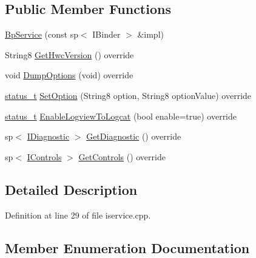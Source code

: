 \subsection*{Public Member Functions}
\begin{DoxyCompactItemize}
\item 
\mbox{\hyperlink{classhwcomposer_1_1BpService_a62e17be4899fc0e9af815cefa9956971}{Bp\+Service}} (const sp$<$ I\+Binder $>$ \&impl)
\item 
String8 \mbox{\hyperlink{classhwcomposer_1_1BpService_a17ce9341ddf723a5e0a565f3dcf0495b}{Get\+Hwc\+Version}} () override
\item 
void \mbox{\hyperlink{classhwcomposer_1_1BpService_a9685bc5b64d6666e6ad3607b6c127bda}{Dump\+Options}} (void) override
\item 
\mbox{\hyperlink{hwcserviceapi_8h_a3806fb2027d9a316d8ca8d9b8b8eb96f}{status\+\_\+t}} \mbox{\hyperlink{classhwcomposer_1_1BpService_a9293da08063a0cbea2906f80470ba383}{Set\+Option}} (String8 option, String8 option\+Value) override
\item 
\mbox{\hyperlink{hwcserviceapi_8h_a3806fb2027d9a316d8ca8d9b8b8eb96f}{status\+\_\+t}} \mbox{\hyperlink{classhwcomposer_1_1BpService_a1c58bedc3a6f9bed36b4daff0ba9048d}{Enable\+Logview\+To\+Logcat}} (bool enable=true) override
\item 
sp$<$ \mbox{\hyperlink{classhwcomposer_1_1IDiagnostic}{I\+Diagnostic}} $>$ \mbox{\hyperlink{classhwcomposer_1_1BpService_a03db6523ced5f83e89bc1c48c7ee442d}{Get\+Diagnostic}} () override
\item 
sp$<$ \mbox{\hyperlink{classhwcomposer_1_1IControls}{I\+Controls}} $>$ \mbox{\hyperlink{classhwcomposer_1_1BpService_a1d18a82c9d0693cfec5f57781431e335}{Get\+Controls}} () override
\end{DoxyCompactItemize}


\subsection{Detailed Description}


Definition at line 29 of file iservice.\+cpp.



\subsection{Member Enumeration Documentation}
\mbox{\label{classhwcomposer_1_1BpService_a688b4b1338923222d225a99d16e22319}} 
